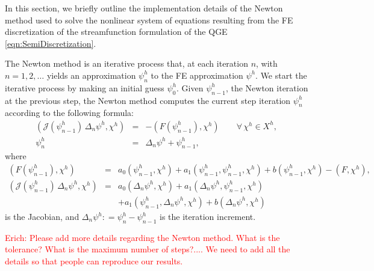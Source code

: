 In this section, we briefly outline the implementation details of the Newton
method used to solve the nonlinear system of equations resulting from the FE
discretization of the streamfunction formulation of the QGE
\eqref{eqn:SemiDiscretization}.

The Newton method is an iterative process that, at each iteration $n$, with
$n=1, 2, \dots$ yields an approximation $\psi^h_n$ to the FE approximation
$\psi^h$.  We start the iterative process by making an initial guess $\psi^h_0$.
Given $\psi^h_{n-1}$, the Newton iteration at the previous step, the Newton
method computes the current step iteration $\psi^h_n$ according to the following
formula:
\begin{eqnarray}
  \left(
  \mathcal{J}(\psi^h_{n-1}) \, \Delta_n \psi^h , \chi^h
  \right)
  &=& -
  \left(
  F(\psi^h_{n-1}) , \chi^h
  \right)
  \qquad
  \forall \, \chi^h \in X^h ,
  \label{eqn:Newton} \\[0.2cm]
  \psi^h_n &=& \Delta_n \psi^h + \psi^h_{n-1},
  \label{eqn:NewPsi}
\end{eqnarray}
where
\begin{eqnarray*}
  \left(
  F(\psi^h_{n-1}) , \chi^h
  \right)
  &=&  a_0(\psi^h_{n-1},\chi^h) + a_1(\psi^h_{n-1},\psi^h_{n-1},\chi^h) + b(\psi^h_{n-1},\chi^h) - (F,\chi^h), \\[0.2cm]
  \left(
  \mathcal{J}(\psi^h_{n-1}) \, \Delta_n \psi^h , \chi^h
  \right)
  &=& a_0(\Delta_n \psi^h,\chi^h)
  + a_1(\Delta_n \psi^h,\psi^h_{n-1},\chi^h)
  \nonumber \\[0.2cm]
  && + a_1(\psi^h_{n-1},\Delta_n \psi^h,\chi^h)
  + b(\Delta_n \psi^h,\chi^h)
\end{eqnarray*}
is the Jacobian, and
$\Delta_n \psi^h : = \psi^h_n - \psi^h_{n-1}$ is the iteration increment.

\textcolor{red}{Erich: Please add more details regarding the Newton method.
What is the tolerance?  What is the maximum number of steps?.... We need to add
all the details so that people can reproduce our results.}
